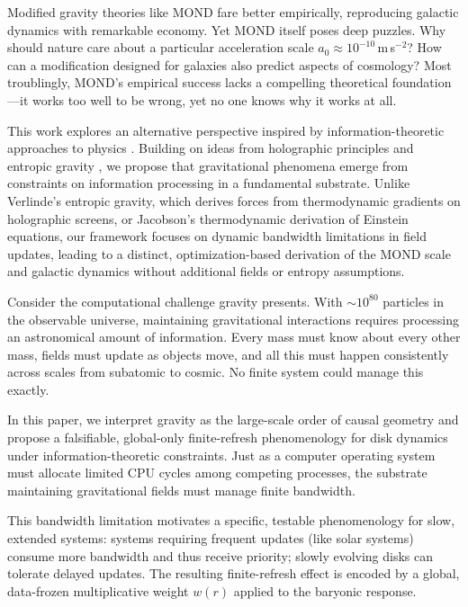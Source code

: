 \documentclass[usenatbib]{mnras}
\begin{document}
Modified gravity theories like MOND \citep{milgrom1983} fare better empirically, reproducing galactic dynamics with remarkable economy. Yet MOND itself poses deep puzzles. Why should nature care about a particular acceleration scale $a_0 \approx 10^{-10}$\,m\,s$^{-2}$? How can a modification designed for galaxies also predict aspects of cosmology? Most troublingly, MOND's empirical success lacks a compelling theoretical foundation---it works too well to be wrong, yet no one knows why it works at all.

This work explores an alternative perspective inspired by information-theoretic approaches to physics \citep{wheeler1990, lloyd2002}. Building on ideas from holographic principles \citep{thooft1993, susskind1995} and entropic gravity \citep{verlinde2011, jacobson1995}, we propose that gravitational phenomena emerge from constraints on information processing in a fundamental substrate. Unlike Verlinde's entropic gravity, which derives forces from thermodynamic gradients on holographic screens, or Jacobson's thermodynamic derivation of Einstein equations, our framework focuses on dynamic bandwidth limitations in field updates, leading to a distinct, optimization-based derivation of the MOND scale and galactic dynamics without additional fields or entropy assumptions.

Consider the computational challenge gravity presents. With $\sim 10^{80}$ particles in the observable universe, maintaining gravitational interactions requires processing an astronomical amount of information. Every mass must know about every other mass, fields must update as objects move, and all this must happen consistently across scales from subatomic to cosmic. No finite system could manage this exactly.

In this paper, we interpret gravity as the large-scale order of causal geometry and propose a falsifiable, global-only finite-refresh phenomenology for disk dynamics under information-theoretic constraints. Just as a computer operating system must allocate limited CPU cycles among competing processes, the substrate maintaining gravitational fields must manage finite bandwidth.

This bandwidth limitation motivates a specific, testable phenomenology for slow, extended systems: systems requiring frequent updates (like solar systems) consume more bandwidth and thus receive priority; slowly evolving disks can tolerate delayed updates. The resulting finite-refresh effect is encoded by a global, data-frozen multiplicative weight $w(r)$ applied to the baryonic response.
\end{document}
